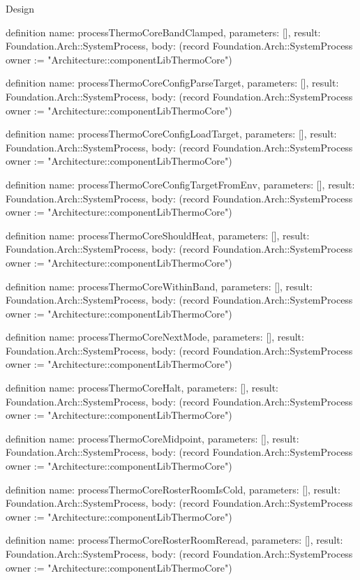 \begin{lexlean}{Design}
\begin{semanticmodule}
definition{
  name: processThermoCoreBandClamped,
  parameters: [],
  result: Foundation.Arch::SystemProcess,
  body: (record Foundation.Arch::SystemProcess {owner := "Architecture::componentLibThermoCore"})
}

definition{
  name: processThermoCoreConfigParseTarget,
  parameters: [],
  result: Foundation.Arch::SystemProcess,
  body: (record Foundation.Arch::SystemProcess {owner := "Architecture::componentLibThermoCore"})
}

definition{
  name: processThermoCoreConfigLoadTarget,
  parameters: [],
  result: Foundation.Arch::SystemProcess,
  body: (record Foundation.Arch::SystemProcess {owner := "Architecture::componentLibThermoCore"})
}

definition{
  name: processThermoCoreConfigTargetFromEnv,
  parameters: [],
  result: Foundation.Arch::SystemProcess,
  body: (record Foundation.Arch::SystemProcess {owner := "Architecture::componentLibThermoCore"})
}

definition{
  name: processThermoCoreShouldHeat,
  parameters: [],
  result: Foundation.Arch::SystemProcess,
  body: (record Foundation.Arch::SystemProcess {owner := "Architecture::componentLibThermoCore"})
}

definition{
  name: processThermoCoreWithinBand,
  parameters: [],
  result: Foundation.Arch::SystemProcess,
  body: (record Foundation.Arch::SystemProcess {owner := "Architecture::componentLibThermoCore"})
}

definition{
  name: processThermoCoreNextMode,
  parameters: [],
  result: Foundation.Arch::SystemProcess,
  body: (record Foundation.Arch::SystemProcess {owner := "Architecture::componentLibThermoCore"})
}

definition{
  name: processThermoCoreHalt,
  parameters: [],
  result: Foundation.Arch::SystemProcess,
  body: (record Foundation.Arch::SystemProcess {owner := "Architecture::componentLibThermoCore"})
}

definition{
  name: processThermoCoreMidpoint,
  parameters: [],
  result: Foundation.Arch::SystemProcess,
  body: (record Foundation.Arch::SystemProcess {owner := "Architecture::componentLibThermoCore"})
}

definition{
  name: processThermoCoreRosterRoomIsCold,
  parameters: [],
  result: Foundation.Arch::SystemProcess,
  body: (record Foundation.Arch::SystemProcess {owner := "Architecture::componentLibThermoCore"})
}

definition{
  name: processThermoCoreRosterRoomReread,
  parameters: [],
  result: Foundation.Arch::SystemProcess,
  body: (record Foundation.Arch::SystemProcess {owner := "Architecture::componentLibThermoCore"})
}


\end{semanticmodule}
\end{lexlean}
